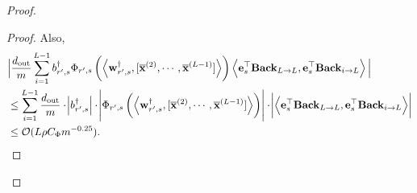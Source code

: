 \begin{claim}
\begin{proof}
\begin{proof}
				Also, 
				\begin{align*}
					&\Big|  \frac{d_{\mathrm{out}} }{m} \sum_{i=1}^{L-1}  b_{r', s}^{\dagger} \Phi_{r', s} \left(\left\langle \mathbf{w}_{r', s}^{\dagger}, [\overline{\mathbf{x}}^{(2)}, \cdots, \overline{\mathbf{x}}^{(L-1)}]\right\rangle\right) \left\langle \mathbf{e}_s^{\top} \mathbf{Back}_{L \to L}, \mathbf{e}_s^{\top} \mathbf{Back}_{i \to L} \right\rangle  \Big| \\&
					\le \sum_{i=1}^{L-1}  \frac{d_{\mathrm{out}} }{m} \cdot \abs{b_{r', s}^{\dagger}} \cdot \abs{\Phi_{r', s} \left(\left\langle \mathbf{w}_{r', s}^{\dagger}, [\overline{\mathbf{x}}^{(2)}, \cdots, \overline{\mathbf{x}}^{(L-1)}]\right\rangle\right)} \cdot \abs{\left\langle \mathbf{e}_s^{\top} \mathbf{Back}_{L \to L}, \mathbf{e}_{s}^{\top} \mathbf{Back}_{i \to L} \right\rangle } \\& \le  \mathcal{O}(L \rho C_{\Phi} m^{-0.25}).
				\end{align*}
				

\end{proof}
\end{proof}
\end{claim}
